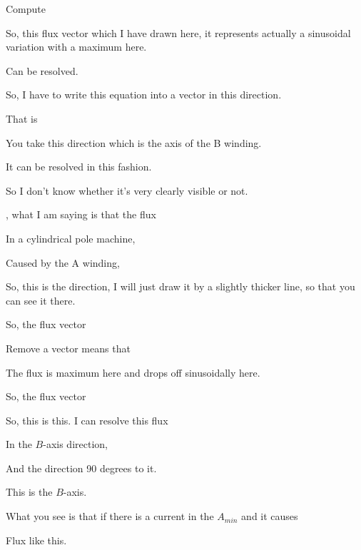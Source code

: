 \documentclass{article}
\begin{document}
Compute

So, this flux vector which I have drawn here, it represents actually a sinusoidal variation with a maximum here.

Can be resolved.

So, I have to write this equation into a vector in this direction.





That is

You take this direction which is the axis of the B winding.











It can be resolved in this fashion.

So I don't know whether it's very clearly visible or not.

, what I am saying is that the flux

In a cylindrical pole machine,

Caused by the A winding,

So, this is the direction, I will just draw it by a slightly thicker line, so that you can see it there.

So, the flux vector

Remove a vector means that

The flux is maximum here and drops off sinusoidally here.

So, the flux vector

So, this is this. I can resolve this flux

In the $B$-axis direction,

And the direction 90 degrees to it.

This is the $B$-axis.

What you see is that if there is a current in the $A_{min}$ and it causes

Flux like this.
\end{document}
